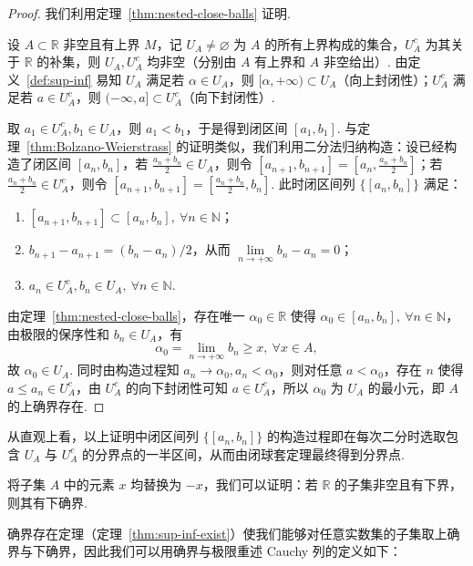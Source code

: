 \documentclass[../main.tex]{subfiles}
\begin{document}
\begin{proof}
    我们利用定理~\ref{thm:nested-close-balls} 证明. 
    
    设 $A \subset \mathbb R$ 非空且有上界 $M$，记 $U_A \neq \varnothing$ 为 $A$ 的所有上界构成的集合，$U_A^c$ 为其关于 $\mathbb R$ 的补集，则 $U_A,U_A^c$ 均非空（分别由 $A$ 有上界和 $A$ 非空给出）. 由定义~\ref{def:sup-inf} 易知 $U_A$ 满足若 $\alpha \in U_A$，则 $[\alpha, +\infty) \subset U_A$（向上封闭性）；$U_A^c$ 满足若 $a \in U_A^c$，则 $(-\infty, a] \subset U_A^c$（向下封闭性）. 
    
    取 $a_1 \in U_A^c, b_1 \in U_A$，则 $a_1 < b_1$，于是得到闭区间 $[a_1, b_1]$. 与定理~\ref{thm:Bolzano-Weierstrass} 的证明类似，我们利用二分法归纳构造：设已经构造了闭区间 $[a_n, b_n]$，若 $\frac{a_n + b_n}{2} \in U_A$，则令 $[a_{n + 1}, b_{n + 1}] = [a_n, \frac{a_n + b_n}{2}]$；若 $\frac{a_n + b_n}{2} \in U_A^c$，则令 $[a_{n + 1}, b_{n + 1}] = [\frac{a_n + b_n}{2}, b_n]$. 此时闭区间列 $\{[a_n, b_n]\}$ 满足：
    \begin{enumerate}[label=(\alph*)]
        \item $[a_{n + 1}, b_{n + 1}] \subset [a_n, b_n],\ \forall n \in \mathbb N$；
        \item $b_{n + 1} - a_{n + 1} = (b_n - a_n) / 2$，从而 $\lim\limits_{n \to +\infty} b_n - a_n = 0$；
        \item $a_n \in U_A^c, b_n \in U_A,\ \forall n \in \mathbb N$. 
    \end{enumerate}
    由定理~\ref{thm:nested-close-balls}，存在唯一 $\alpha_0 \in \mathbb R$ 使得 $\alpha_0 \in [a_n, b_n],\ \forall n \in \mathbb N$，由极限的保序性和 $b_n \in U_A$，有
    $$
    \alpha_0 = \lim\limits_{n \to +\infty} b_n \geqslant x,\ \forall x \in A, 
    $$
    故 $\alpha_0 \in U_A$. 同时由构造过程知 $a_n \to \alpha_0, a_n < \alpha_0$，则对任意 $a < \alpha_0$，存在 $n$ 使得 $a \leqslant a_n \in U_A^c$，由 $U_A^c$ 的向下封闭性可知 $a \in U_A^c$，所以 $\alpha_0$ 为 $U_A$ 的最小元，即 $A$ 的上确界存在. 
\end{proof}

\begin{remark}
    从直观上看，以上证明中闭区间列 $\{[a_n, b_n]\}$ 的构造过程即在每次二分时选取包含 $U_A$ 与 $U_A^c$ 的分界点的一半区间，从而由闭球套定理最终得到分界点. 

    将子集 $A$ 中的元素 $x$ 均替换为 $-x$，我们可以证明：若 $\mathbb R$ 的子集非空且有下界，则其有下确界. 
\end{remark}

确界存在定理（定理~\ref{thm:sup-inf-exist}）使我们能够对任意实数集的子集取上确界与下确界，因此我们可以用确界与极限重述 Cauchy 列的定义如下：
\end{document}
